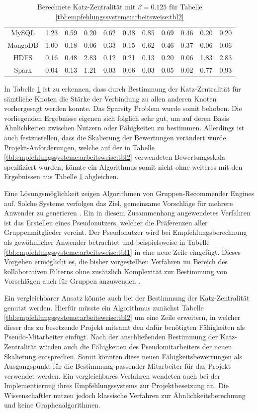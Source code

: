 \begin{table}[h]
\begin{tabular}{c|c|c|c|c|c|c|c|c|c|c}
		MySQL    & 1.23 & 0.59 & 0.20 & 0.62 & 0.38 & 0.85 & 0.69 & 0.46 & 0.20 & 0.20\\
		MongoDB  & 1.00 & 0.18 & 0.06 & 0.33 & 0.15 & 0.62 & 0.46 & 0.37 & 0.06 & 0.06\\
		HDFS     & 0.16 & 0.48 & 2.83 & 0.12 & 0.21 & 0.13 & 0.20 & 0.06 & 1.83 & 2.83\\
		Spark    & 0.04 & 0.13 & 1.21 & 0.03 & 0.06 & 0.03 & 0.05 & 0.02 & 0.77 & 0.93
	\end{tabular}
	\caption{Berechnete Katz-Zentralität mit $\beta = 0.125$ für Tabelle \ref{tbl:empfehlungssysteme:arbeitsweise:tbl2}}
	\label{tbl:empfehlungssysteme:arbeitsweise:tbl3}
\end{table}

In Tabelle \ref{tbl:empfehlungssysteme:arbeitsweise:tbl3} ist zu erkennen, dass durch Bestimmung der Katz-Zentralität für sämtliche Knoten die Stärke der Verbindung zu allen anderen Knoten vorhergesagt werden konnte. Das Sparsity Problem wurde somit behoben. Die vorliegenden Ergebnisse eigenen sich folglich sehr gut, um auf deren Basis Ähnlichkeiten zwischen Nutzern oder Fähigkeiten zu bestimmen. Allerdings ist auch festzustellen, dass die Skalierung der Bewertungen verändert wurde. Projekt-Anforderungen, welche auf der in Tabelle \ref{tbl:empfehlungssysteme:arbeitsweise:tbl2} verwendeten Bewertungsskala spezifiziert wurden, könnte ein Algorithmus somit nicht ohne weiteres mit den Ergebnissen aus Tabelle \ref{tbl:empfehlungssysteme:arbeitsweise:tbl3} abgleichen.

Eine Lösungsmöglichkeit zeigen Algorithmen von Gruppen-Recommender Engines auf. Solche Systeme verfolgen das Ziel, gemeinsame Vorschläge für mehrere Anwender zu generieren \cite[S. 1]{dara:2020}. Ein in diesem Zusammenhang angewendetes Verfahren ist das Erstellen eines Pseudonutzers, welcher die Präferenzen aller Gruppenmitglieder vereint. Der Pseudonutzer wird bei Empfehlungsberechnung als gewöhnlicher Anwender betrachtet und beispielsweise in Tabelle \ref{tbl:empfehlungssysteme:arbeitsweise:tbl1} in eine neue Zeile eingefügt. Dieses Vorgehen ermöglicht es, die bisher vorgestellten Verfahren im Bereich des kollaborativen Filterns ohne zusätzlich Komplexität zur Bestimmung von Vorschlägen auch für Gruppen anzuwenden \cite[S. 8f.]{oconnor:2001}.

Ein vergleichbarer Ansatz könnte auch bei der Bestimmung der Katz-Zentralität genutzt werden. Hierfür müsste ein Algorithmus zunächst Tabelle \ref{tbl:empfehlungssysteme:arbeitsweise:tbl2} um eine Zeile erweitern, in welcher dieser das zu besetzende Projekt mitsamt den dafür benötigten Fähigkeiten als Pseudo-Mitarbeiter einfügt. Nach der anschließenden Bestimmung der Katz-Zentralität würden auch die Fähigkeiten des Pseudomitarbeiters der neuen Skalierung entsprechen. Somit könnten diese neuen Fähigkeitsbewertungen als Ausgangspunkt für die Bestimmung passender Mitarbeiter für das Projekt verwendet werden. Ein vergleichbares Verfahren wendeten auch \textcite[S. 2]{mitre:2014} bei der Implementierung ihres Empfehlungssystems zur Projektbesetzung an. Die Wissenschaftler nutzen jedoch klassische Verfahren zur Ähnlichkeitsberechnung und keine Graphenalgorithmen.

